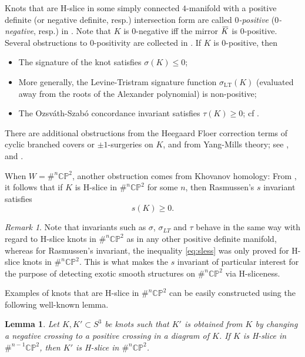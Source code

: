 \documentclass [11pt]{amsart}
\newtheorem {lemma}[theorem]{Lemma}
\theoremstyle{remark}
\newtheorem {remark}[theorem]{Remark}
\def\CP{\mathbb{CP}^2}
\newcommand{\mK} {\mkern3mu \overline{\mkern-3mu K \mkern-1mu} \mkern1mu}
\def\sigmaTL{\sigma_{\operatorname{LT}}}
\begin{document}
Knots that are H-slice in some simply connected $4$-manifold with a positive definite (or  negative definite, resp.) intersection form are called {\em $0$-positive} ({\em $0$-negative}, resp.) in \cite{CochranHarveyHorn}. Note that $K$ is $0$-negative iff the mirror $\mK$ is $0$-positive. Several obstructions to $0$-positivity are collected in \cite[Proposition 1.1]{CochranHarveyHorn}. If $K$ is $0$-positive, then
\begin{itemize}
\item The signature of the knot satisfies $\sigma(K) \leq 0$;
\item More generally, the Levine-Tristram signature function $\sigmaTL(K)$ (evaluated away from the roots of the Alexander polynomial) is non-positive;
\item The Ozsv\'ath-Szab\'o concordance invariant satisfies $\tau(K) \geq 0$; cf \cite[Theorem 1.1]{OStau}.
\end{itemize}
There are additional obstructions from the Heegaard Floer correction terms of cyclic branched covers or $\pm 1$-surgeries on $K$, and from Yang-Mills theory; see \cite{CochranHarveyHorn}, \cite[Corollary 5.5]{km} and \cite[Theorem 4.1]{DaemiScaduto}.

When $W = \#^n \CP$, another obstruction comes from Khovanov homology: From \cite[Corollary 1.9]{MMSW}, it follows that if $K$ is H-slice in $\#^n \CP$ for some $n$, then Rasmussen's $s$ invariant satisfies
\begin{equation}
\label{eq:sless}
 s(K) \geq 0.
 \end{equation}
 
 \begin{remark}
Note that invariants such as $\sigma$, $\sigma_{LT}$ and $\tau$ behave in the same way with regard to H-slice knots in $\#^n \CP$ as in any other positive definite manifold, whereas for Rasmussen's invariant, the inequality \eqref{eq:sless} was only proved for H-slice knots in $\#^n \CP$. This is what makes the $s$ invariant of particular interest for the purpose of detecting exotic smooth structures on $\#^n \CP$ via H-sliceness.
 \end{remark}

Examples of knots that are H-slice in $ \#^n \CP$ can be easily constructed using the following well-known lemma.
\begin{lemma}
\label{lem:HCP}
Let $K, K' \subset S^3$ be knots such that $K'$ is obtained from $K$ by changing a negative crossing to a positive crossing in a diagram of $K$. If $K$ is H-slice in $\#^{n-1} \CP$, then $K'$ is H-slice in $\#^n \CP$.
\end{lemma}
\end{document}
